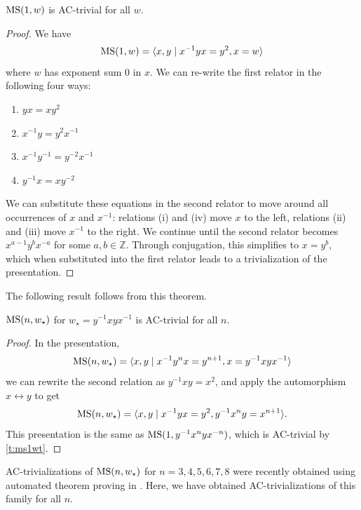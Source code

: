 \begin{theorem}\label{t:ms1wt}
    $\text{MS}(1,w)$ is AC-trivial for all $w$.
\end{theorem}

\begin{proof}
We have 
\[
\text{MS}(1, w) = \langle x, y \mid x^{-1} y x = y^{2}, x = w\rangle
\]
where $w$ has exponent sum 0 in $x$. We can re-write the first relator in the following four ways: 
\begin{enumerate}[label=(\roman*)]
    \item $yx=xy^2$
    \item $x^{-1}y = y^2 x^{-1}$
    \item $x^{-1}y^{-1}=y^{-2}x^{-1}$
    \item $y^{-1}x = xy^{-2}$
\end{enumerate}

We can substitute these equations in the second relator to move around all occurrences of $x$ and $x^{-1}$: relations (i) and (iv) move $x$ to the left, relations (ii) and (iii) move $x^{-1}$ to the right. We continue until the second relator becomes $x^{a-1} y^b x^{-a}$ for some $a, b \in \mathbb{Z}$. Through conjugation, this simplifies to $x = y^b$, which when substituted into the first relator leads to a trivialization of the presentation.
\end{proof}

The following result follows from this theorem.

\begin{theorem}\label{t:msnw}
    $\text{MS}(n, w_\star)$ for $w_\star = y^{-1} x y x^{-1}$ is AC-trivial for all $n$.
\end{theorem}

\begin{proof}
In the presentation,
\[
\text{MS}(n, w_\star) = \langle x, y \mid x^{-1} y^n x = y^{n+1}, x = y^{-1} x y x^{-1} \rangle
\]
we can rewrite the second relation as $y^{-1} x y = x^2$, and apply the automorphism $x \leftrightarrow y$ to get
\[
\text{MS}(n, w_\star) = \langle x, y \mid
x^{-1} y x = y^2 , y^{-1} x^n y = x^{n+1}\rangle.
\]
This presentation is the same as $\text{MS}(1, y^{-1} x^n y x^{-n})$, which is AC-trivial by \cref{t:ms1wt}. 
\end{proof}

AC-trivializations of $\text{MS}(n, w_\star)$ for $n = 3, 4, 5, 6, 7, 8$ were recently obtained using automated theorem proving in \cite{new-ac-for-ms}. Here, we have obtained AC-trivializations of this family for all $n$.




